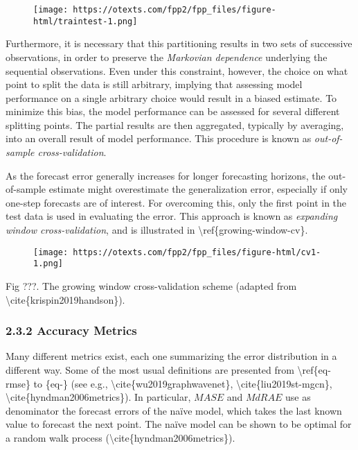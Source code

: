 \documentclass[
]{article}
\begin{document}
\begin{figure}
\centering
\texttt{[image: https://otexts.com/fpp2/fpp\_files/figure-html/traintest-1.png]}
\caption{}
\end{figure}

Furthermore, it is necessary that this partitioning results in two sets
of successive observations, in order to preserve the \emph{Markovian
dependence} underlying the sequential observations. Even under this
constraint, however, the choice on what point to split the data is still
arbitrary, implying that assessing model performance on a single
arbitrary choice would result in a biased estimate. To minimize this
bias, the model performance can be assessed for several different
splitting points. The partial results are then aggregated, typically by
averaging, into an overall result of model performance. This procedure
is known as \emph{out-of-sample cross-validation}.

As the forecast error generally increases for longer forecasting
horizons, the out-of-sample estimate might overestimate the
generalization error, especially if only one-step forecasts are of
interest. For overcoming this, only the first point in the test data is
used in evaluating the error. This approach is known as \emph{expanding
window cross-validation}, and is illustrated in
\textbackslash ref\{growing-window-cv\}.

\begin{figure}
\centering
\texttt{[image: https://otexts.com/fpp2/fpp\_files/figure-html/cv1-1.png]}
\caption{}
\end{figure}

Fig ???. The growing window cross-validation scheme (adapted from
\textbackslash cite\{krispin2019handson\}).

\hypertarget{header-n45}{%
\subsubsection{2.3.2 Accuracy Metrics}\label{header-n45}}

Many different metrics exist, each one summarizing the error
distribution in a different way. Some of the most usual definitions are
presented from \textbackslash ref\{eq-rmse\} to \{eq-\} (see e.g.,
\textbackslash cite\{wu2019graphwavenet\},
\textbackslash cite\{liu2019st-mgcn\},
\textbackslash cite\{hyndman2006metrics\}). In particular, \(MASE\) and
\(MdRAE\) use as denominator the forecast errors of the naïve model,
which takes the last known value to forecast the next point. The naïve
model can be shown to be optimal for a random walk process
(\textbackslash cite\{hyndman2006metrics\}).
\end{document}

